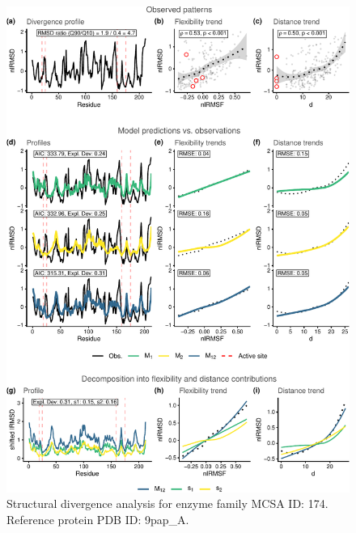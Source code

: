 \documentclass[
]{article}
\begin{document}
\clearpage
\begin{figure}[H]
\centering


\begin{center}\includegraphics{supplementary_material_files/figure-latex/generate_figures-10} \end{center}

\caption{Structural divergence analysis for enzyme family MCSA ID: 174. Reference protein PDB ID: 9pap\_A.}
\end{figure}
\end{document}
